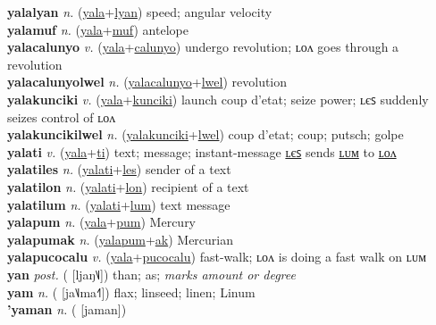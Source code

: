 \textbf{yalalyan} \textit{n.} (\hyperref[yala]{yala}+\hyperref[lyan]{lyan})
speed; angular velocity \label{yalalyan} \\
\textbf{yalamuf} \textit{n.} (\hyperref[yala]{yala}+\hyperref[muf]{muf})
antelope \label{yalamuf} \\
\textbf{yalacalunyo} \textit{v.} (\hyperref[yala]{yala}+\hyperref[calunyo]{calunyo})
undergo revolution; ʟᴏᴧ goes through a revolution \label{yalacalunyo} \\
\textbf{yalacalunyolwel} \textit{n.} (\hyperref[yalacalunyo]{yalacalunyo}+\hyperref[lwel]{lwel})
revolution \label{yalacalunyolwel} \\
\textbf{yalakunciki} \textit{v.} (\hyperref[yala]{yala}+\hyperref[kunciki]{kunciki})
launch coup d’etat; seize power; ʟєꜱ suddenly seizes control of ʟᴏᴧ \label{yalakunciki} \\
\textbf{yalakuncikilwel} \textit{n.} (\hyperref[yalakunciki]{yalakunciki}+\hyperref[lwel]{lwel})
coup d’etat; coup; putsch; golpe \label{yalakuncikilwel} \\
\textbf{yalati} \textit{v.} (\hyperref[yala]{yala}+\hyperref[ti]{ti})
text; message; instant-message \hyperref[yalatiles]{ʟєꜱ} sends \hyperref[yalatilum]{ʟᴜᴍ} to \hyperref[yalatilon]{ʟᴏᴧ} \label{yalati} \\
\textbf{yalatiles} \textit{n.} (\hyperref[yalati]{yalati}+\hyperref[les]{les})
sender of a text \label{yalatiles} \\
\textbf{yalatilon} \textit{n.} (\hyperref[yalati]{yalati}+\hyperref[lon]{lon})
recipient of a text \label{yalatilon} \\
\textbf{yalatilum} \textit{n.} (\hyperref[yalati]{yalati}+\hyperref[lum]{lum})
text message \label{yalatilum} \\
\textbf{yalapum} \textit{n.} (\hyperref[yala]{yala}+\hyperref[pum]{pum})
Mercury \label{yalapum} \\
\textbf{yalapumak} \textit{n.} (\hyperref[yalapum]{yalapum}+\hyperref[ak]{ak})
Mercurian \label{yalapumak} \\
\textbf{yalapucocalu} \textit{v.} (\hyperref[yala]{yala}+\hyperref[pucocalu]{pucocalu})
fast-walk; ʟᴏᴧ is doing a fast walk on ʟᴜᴍ \label{yalapucocalu} \\
\textbf{yan} \textit{post.} ( [ljaŋ˥˩])
than; as; \textit{marks amount or degree} \label{yan} \\
\textbf{yam} \textit{n.} ( [ja˥˩ma˧˥])
flax; linseed; linen; Linum \label{yam} \\
\textbf{'yaman} \textit{n.} ( [jaman])
